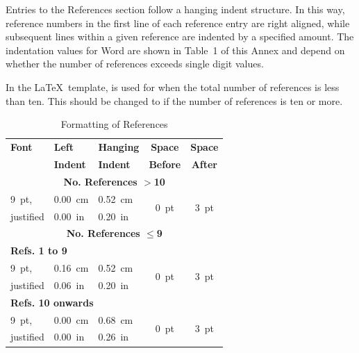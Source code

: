 \documentclass[a4paper,
              ]{jacow}
\begin{document}
Entries to the References section follow a hanging indent
structure. In this way, reference numbers in the first
line of each reference entry are right aligned, while subsequent
lines within a given reference are indented by a
specified amount. The indentation values for Word are
shown in Table~1 of this Annex and depend on whether
the number of references exceeds single digit values.

In the \LaTeX\ template, \verb|| is used for
when the total number of references is less than ten. This
should be changed to \verb|| if the number of
references is ten or more.

\begin{table}[h!t]
	\centering
	\caption{Formatting of References}
	\label{format-refs}
	\begin{tabular}{lllcc}
		\toprule
		\textbf{Font} & \textbf{Left}   & \textbf{Hanging}  & \textbf{Space}   & \textbf{Space} \\
		              & \textbf{Indent} & \textbf{Indent}   & \textbf{Before}  & \textbf{After} \\
		\midrule
		\multicolumn{5}{c}{\textbf{No. References $>$10}}  \\[1mm]
		\SI{9}{pt},   & \SI{0.00}{cm}   & \SI{0.52}{cm}     & \multirow{2}{*}{\SI{0}{pt}} 
																			   & \multirow{2}{*}{\SI{3}{pt}}  \\
		justified     & \SI{0.00}{in}   & \SI{0.20}{in}     &                  &             \\
		\midrule
		\multicolumn{5}{c}{\textbf{No. References $\le$9}}  \\
		\multicolumn{5}{l}{\textbf{Refs. 1 to 9}}           \\[1mm]
		\SI{9}{pt},   & \SI{0.16}{cm}   & \SI{0.52}{cm}     &  \multirow{2}{*}{\SI{0}{pt}} 
																			   & \multirow{2}{*}{\SI{3}{pt}}  \\
		justified     & \SI{0.06}{in}   & \SI{0.20}{in}     &                  &             \\[3mm]		\multicolumn{5}{l}{\textbf{Refs. 10 onwards}}    \\[1mm]
		\SI{9}{pt},   & \SI{0.00}{cm}   & \SI{0.68}{cm}     &  \multirow{2}{*}{\SI{0}{pt}} 
																	           & \multirow{2}{*}{\SI{3}{pt}}  \\
		justified     & \SI{0.00}{in}   & \SI{0.26}{in}     &                  &             \\
		\bottomrule  
	\end{tabular}
\end{table}
\end{document}
